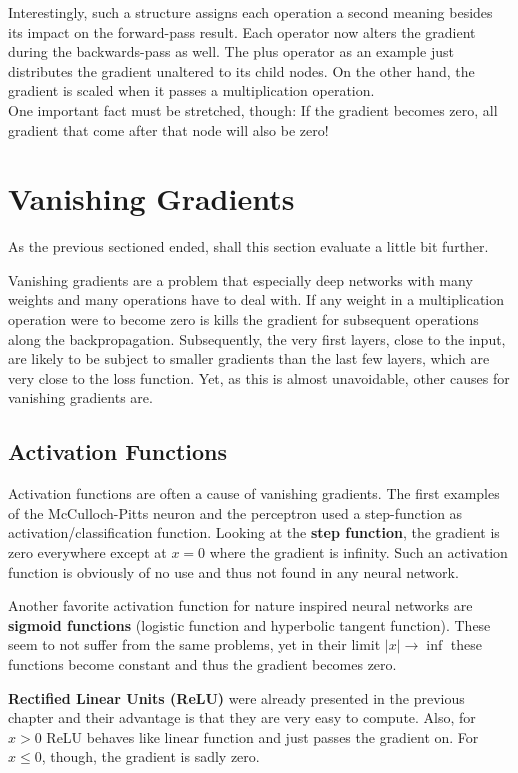 Interestingly, such a structure assigns each operation a second meaning besides its impact on the forward-pass result.
Each operator now alters the gradient during the backwards-pass as well.
The plus operator as an example just distributes the gradient unaltered to its child nodes.
On the other hand, the gradient is scaled when it passes a multiplication operation. \\
One important fact must be stretched, though:
If the gradient becomes zero, all gradient that come after that node will also be zero!

\section{Vanishing Gradients}
As the previous sectioned ended, shall this section evaluate a little bit further.

Vanishing gradients are a problem that especially deep networks with many weights and many operations have to deal with.
If any weight in a multiplication operation were to become zero is kills the gradient for subsequent operations along the backpropagation.
Subsequently, the very first layers, close to the input, are likely to be subject to smaller gradients than the last few layers, which are very close to the loss function.
Yet, as this is almost unavoidable, other causes for vanishing gradients are.

\subsection{Activation Functions}
Activation functions are often a cause of vanishing gradients.
The first examples of the McCulloch-Pitts neuron and the perceptron used a step-function as activation/classification function.
Looking at the \textbf{step function}, the gradient is zero everywhere except at $x = 0$ where the gradient is infinity.
Such an activation function is obviously of no use and thus not found in any neural network.

Another favorite activation function for nature inspired neural networks are \textbf{sigmoid functions} (logistic function and hyperbolic tangent function).
These seem to not suffer from the same problems, yet in their limit $|x| \rightarrow \inf$ these functions become constant and thus the gradient becomes zero.

\textbf{Rectified Linear Units (ReLU)} were already presented in the previous chapter and their advantage is that they are very easy to compute.
Also, for $x > 0$ ReLU behaves like linear function and just passes the gradient on.
For $x \leq 0$, though, the gradient is sadly zero.

